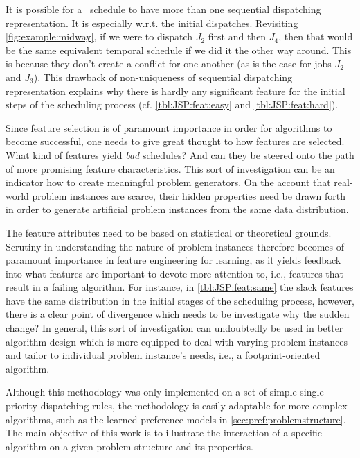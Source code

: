 It is possible for a \JSP\ schedule to have more than one sequential 
dispatching representation. It is especially w.r.t. the initial dispatches. 
Revisiting \cref{fig:example:midway}, if we were to dispatch $J_2$ 
first and then $J_4$, then that would be the same equivalent
temporal schedule if we did it the other way around. 
This is because they don't create a conflict for one another 
(as is the case for jobs $J_2$ and $J_3$). This drawback of non-uniqueness of 
sequential dispatching representation explains why there is hardly any 
significant feature for the initial steps of the scheduling process (cf. 
\cref{tbl:JSP:feat:easy} and \cref{tbl:JSP:feat:hard}). 

Since feature selection is of paramount importance in order for algorithms to become successful, one needs to give great thought to how features are selected. What kind of features yield \emph{bad} schedules? And can they be steered onto the path of more promising feature characteristics. This sort of investigation can be an indicator how to create meaningful problem generators. On the account that real-world problem instances are scarce, their hidden properties need be drawn forth in order to generate artificial problem instances from the same data distribution. 

The feature attributes need to be based on statistical or theoretical grounds. 
Scrutiny in understanding the nature of problem instances therefore becomes of paramount importance in feature engineering for learning, as it yields feedback into what features are important to devote more attention to, i.e., features that result in a failing algorithm. 
For instance, in \cref{tbl:JSP:feat:same} the slack features have the same 
distribution in the initial stages of the scheduling process, however, there is 
a clear point of divergence which needs to be investigate why the sudden 
change? 
In general, this sort of investigation can undoubtedly be used in better algorithm design which is more equipped to deal with varying problem instances and tailor to individual problem instance's needs, i.e., a footprint-oriented algorithm. 

Although this methodology was only implemented on a set of simple single-priority dispatching rules, the methodology is easily adaptable for more complex algorithms, such as the learned preference models in \cref{sec:pref:problemstructure}. The main objective of this work is to illustrate the interaction of a specific algorithm on a given problem structure and its properties. 